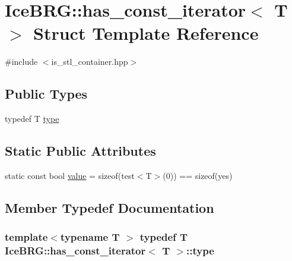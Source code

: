 \hypertarget{structIceBRG_1_1has__const__iterator}{}\section{Ice\+B\+R\+G\+:\+:has\+\_\+const\+\_\+iterator$<$ T $>$ Struct Template Reference}
\label{structIceBRG_1_1has__const__iterator}


{\ttfamily \#include $<$is\+\_\+stl\+\_\+container.\+hpp$>$}

\subsection*{Public Types}
\begin{DoxyCompactItemize}
\item 
typedef T \hyperlink{structIceBRG_1_1has__const__iterator_afbff11e5791bea701acbaa0ae46cb361}{type}
\end{DoxyCompactItemize}
\subsection*{Static Public Attributes}
\begin{DoxyCompactItemize}
\item 
static const bool \hyperlink{structIceBRG_1_1has__const__iterator_a1eb21b02a08ba62ddb94c4fb8247f1db}{value} = sizeof(test$<$T$>$(0)) == sizeof(yes)
\end{DoxyCompactItemize}


\subsection{Member Typedef Documentation}
\hypertarget{structIceBRG_1_1has__const__iterator_afbff11e5791bea701acbaa0ae46cb361}{}
\subsubsection[{type}]{\setlength{\rightskip}{0pt plus 5cm}template$<$typename T $>$ typedef T {\bf Ice\+B\+R\+G\+::has\+\_\+const\+\_\+iterator}$<$ T $>$\+::{\bf type}}\label{structIceBRG_1_1has__const__iterator_afbff11e5791bea701acbaa0ae46cb361}


